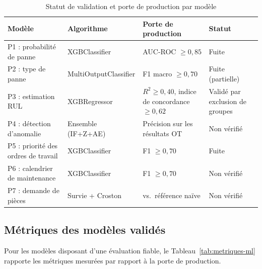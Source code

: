 \begin{table}[h]
\centering
\begin{tabularx}{\textwidth}{|X|X|X|X|}
\toprule
\textbf{Modèle} & \textbf{Algorithme} & \textbf{Porte de production} & \textbf{Statut} \\
\midrule
P1 : probabilité de panne   & XGBClassifier         & AUC-ROC $\geq 0{,}85$            & Fuite \\
\midrule
P2 : type de panne          & MultiOutputClassifier & F1 macro $\geq 0{,}70$           & Fuite (partielle) \\
\midrule
P3 : estimation RUL          & XGBRegressor          & $R^2 \geq 0{,}40$, indice de concordance $\geq 0{,}62$ & Validé par exclusion de groupes \\
\midrule
P4 : détection d'anomalie     & Ensemble (IF+Z+AE)    & Précision sur les résultats OT       & Non vérifié \\
\midrule
P5 : priorité des ordres de travail   & XGBClassifier         & F1 $\geq 0{,}70$                 & Fuite \\
\midrule
P6 : calendrier de maintenance  & XGBClassifier         & F1 $\geq 0{,}70$                 & Non vérifié \\
\midrule
P7 : demande de pièces          & Survie + Croston    & vs.\ référence naïve            & Non vérifié \\
\bottomrule
\end{tabularx}
\caption{Statut de validation et porte de production par modèle}
\label{tab:validation-status}
\end{table}

\subsection{Métriques des modèles validés}

Pour les modèles disposant d'une évaluation fiable, le Tableau~\ref{tab:metriques-ml} rapporte les métriques mesurées par rapport à la porte de production.

